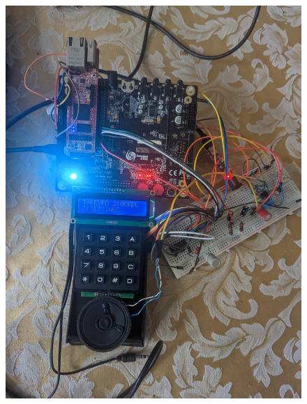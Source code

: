\documentclass[11pt,a4paper,twocolumn]{scrartcl}
\begin{document}
\begin{figure}
   \centering
   \begin{minipage}[b]{0.4\textwidth}
     \includegraphics[width=\textwidth]{microcontroller_project2.jpg}
   \end{minipage}
   \begin{minipage}[b]{0.4\textwidth}

\end{minipage}
\end{figure}
\end{document}
